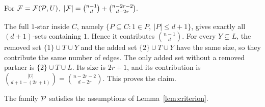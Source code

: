 \begin{claim}\label{claim:main-count}
For \(\mathcal{F}=\mathcal{F}(\mathcal{P},U)\),
\(
|\mathcal{F}|=\binom{n-1}{d}+\binom{n-2r-2}{d-2r}.
\)
\end{claim}

\begin{poc}
The full \(1\)-star inside \(C\), namely \(\{P\subseteq C:1\in P,\ |P|\le d+1\}\), gives exactly all \((d+1)\)-sets containing \(1\). Hence it contributes \(\binom{n-1}{d}\). For every \(Y\subsetneq L\), the removed set \(\{1\}\cup T\cup Y\) and the added set \(\{2\}\cup T\cup Y\) have the same size, so they contribute the same number of edges. The only added set without a removed partner is \(\{2\}\cup T\cup L\). Its size is \(2r+1\), and its contribution is \(\binom{|U|}{d+1-(2r+1)}=\binom{n-2r-2}{d-2r}.\)
This proves the claim.
\end{poc}

\begin{claim}\label{claim:main-certificate}
The family \(\mathcal{P}\) satisfies the assumptions of Lemma~\ref{lem:criterion}.
\end{claim}

